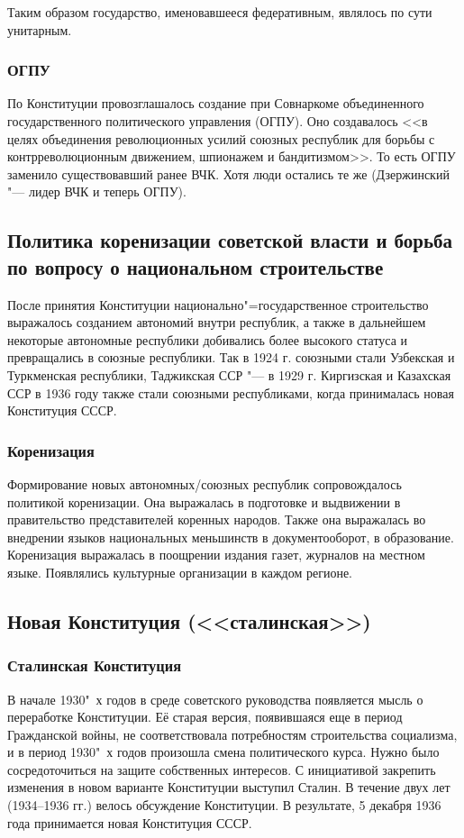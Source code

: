 Таким образом государство, именовавшееся федеративным, являлось по сути унитарным.

\subsubsection{\textbf{ОГПУ}}

По Конституции провозглашалось создание при Совнаркоме объединенного государственного политического управления (ОГПУ). Оно создавалось <<в целях объединения революционных усилий союзных республик для борьбы с контрреволюционным движением, шпионажем и бандитизмом>>. То есть ОГПУ заменило существовавший ранее ВЧК. Хотя люди остались те же (Дзержинский "--- лидер ВЧК и теперь ОГПУ).

\subsection{Политика коренизации советской власти и борьба по вопросу о национальном строительстве}

После принятия Конституции национально"=государственное строительство выражалось созданием автономий внутри республик, а также в дальнейшем некоторые автономные республики добивались более высокого статуса и превращались в союзные республики. Так в 1924 г. союзными стали Узбекская и Туркменская республики, Таджикская ССР "--- в 1929 г. Киргизская и Казахская ССР в 1936 году также стали союзными республиками, когда принималась новая Конституция СССР.

\subsubsection{\textbf{Коренизация}}

Формирование новых автономных/союзных республик сопровождалось политикой коренизации. Она выражалась в подготовке и выдвижении в правительство представителей коренных народов. Также она выражалась во внедрении языков национальных меньшинств в документооборот, в образование. Коренизация выражалась в поощрении издания газет, журналов на местном языке. Появлялись культурные организации в каждом регионе.

\subsection{Новая Конституция (<<сталинская>>)}

\subsubsection{\textbf{Сталинская Конституция}}
В начале 1930"~х годов в среде советского руководства появляется мысль о переработке Конституции. Её старая версия, появившаяся еще в период Гражданской войны, не соответствовала потребностям строительства социализма, и в период 1930"~х годов произошла смена политического курса. Нужно было сосредоточиться на защите собственных интересов. С инициативой закрепить изменения в новом варианте Конституции выступил Сталин. В течение двух лет (1934--1936 гг.) велось обсуждение Конституции. В результате, 5 декабря 1936 года принимается новая Конституция СССР. 

